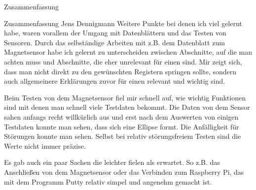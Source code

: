 \documentclass[12pt]{report}
\begin{document}
\begin{section}{Zusammenfassung}
\begin{subsection}{Zusammenfassung Jens Dennigmann}
  Weitere Punkte bei denen ich viel gelernt habe, waren vorallem der Umgang mit Datenblättern 
  und das Testen von Sensoren. Durch das selbständige Arbeiten mit z.B. dem Datenblatt zum 
  Magnetsensor habe ich gelernt zu unterscheiden zwischen Abschnitte, auf die
  man achten muss und Abschnitte, die eher unrelevant für einen sind. Mir zeigt
  sich, dass man nicht direkt zu den gewünschten Registern springen sollte, sondern auch 
  allgemeinere Erklärungen zuvor für einen relevant und wichtig sind.
  
  Beim Testen von dem Magnetsensor fiel mir schnell auf, wie wichtig Funktionen sind mit denen 
  man schnell viele Testdaten bekommt. Die Daten von dem Sensor sahen anfangs recht willkürlich 
  aus und erst nach dem Auswerten von einigen Testdaten konnte man sehen, dass sich eine 
  Ellipse formt. Die Anfälligkeit für Störungen konnte man sehen. Selbst bei
  relativ störungsfreiem Testen sind die Werte nicht immer präzise.
  
  Es gab auch ein paar Sachen die leichter fielen als erwartet. So z.B. das
      Anschließen von dem Magnetsensor oder das Verbinden zum Raspberry Pi, das mit dem Programm Putty relativ simpel 
      und angenehm gemacht ist. 


\end{subsection}
\end{section}
\end{document}
